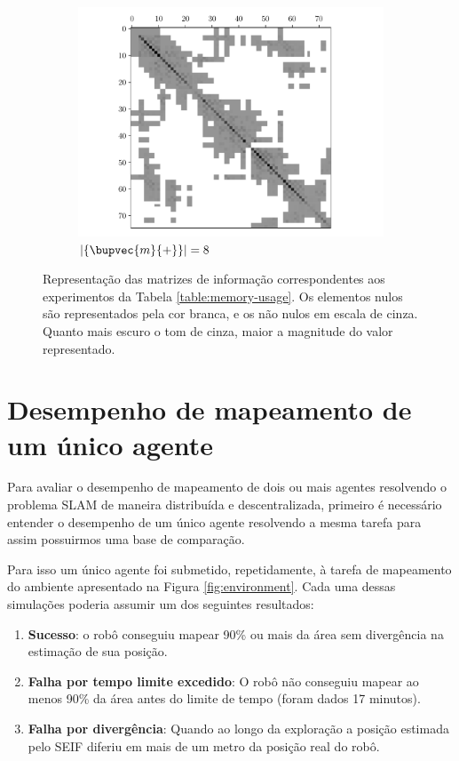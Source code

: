 \begin{figure}
\begin{subfigure}{0.49\textwidth}
    \includegraphics[width=\textwidth]{figs/seif-8-info-matrix.pdf} 
    \caption{$\lvert\{ \bupvec{m}{+} \}\rvert = 8$}
    \label{fig:seif-info-matrix-08}
  \end{subfigure}
  \caption[Matrizes de informação resultantes de diferentes valores de cardinalidade do conjunto de \textit{landmarks} ativas]{Representação das matrizes de informação correspondentes aos experimentos da Tabela \ref{table:memory-usage}. Os elementos nulos são representados pela cor branca, e os não nulos em escala de cinza. Quanto mais escuro o tom de cinza, maior a magnitude do valor representado.}
  \label{fig:seif-info-matrix-memory}
\end{figure}


\section{Desempenho de mapeamento de um único agente}
Para avaliar o desempenho de mapeamento de dois ou mais agentes 
resolvendo o problema SLAM de maneira distribuída e descentralizada, 
primeiro é necessário entender o desempenho de um único agente 
resolvendo a mesma tarefa para assim possuirmos uma base de comparação.

Para isso um único agente foi submetido, repetidamente, à tarefa de mapeamento do ambiente apresentado na Figura \ref{fig:environment}. 
Cada uma dessas simulações poderia assumir um dos seguintes resultados:
\begin{enumerate}
  \item \textbf{Sucesso}: o robô conseguiu mapear 90\% ou mais da área sem 
  divergência na estimação de sua posição.
  \item \textbf{Falha por tempo limite excedido}: O robô não conseguiu mapear ao 
  menos 90\% da área antes do limite de tempo (foram dados 17 
  minutos).
  \item \textbf{Falha por divergência}: Quando ao longo da exploração a posição estimada pelo SEIF diferiu em mais de um metro da posição real do robô.
\end{enumerate}

